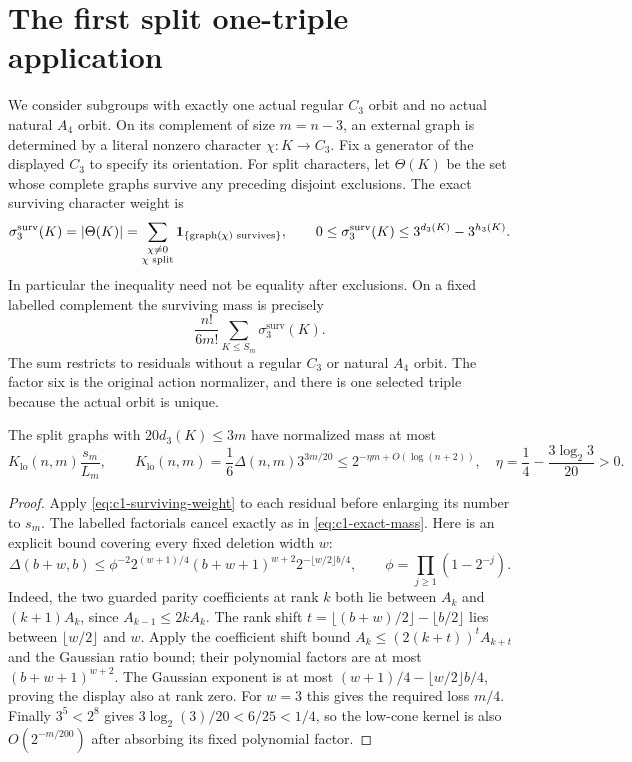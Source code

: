 \section{The first split one-triple application}\label{sec:first-c1}
We consider subgroups with exactly one actual regular $C_3$ orbit and
no actual natural $A_4$ orbit. On its complement of size $m=n-3$, an
external graph is determined by a literal nonzero character
$\chi:K\to C_3$. Fix a generator of the displayed $C_3$ to specify
its orientation. For split characters, let $\Theta(K)$ be the set
whose complete graphs survive any preceding disjoint exclusions.
The exact surviving character weight is
\begin{equation}\label{eq:c1-surviving-weight}
 \sigma^{\mathrm{surv}}_3(K)=|\Theta(K)|
 =\sum_{\substack{\chi\ne0\\\chi\text{ split}}}
       {\bf1}_{\{\operatorname{graph}(\chi)\text{ survives}\}},
 \qquad
 0\leq\sigma^{\mathrm{surv}}_3(K)\leq3^{d_3(K)}-3^{h_3(K)}.
\end{equation}
In particular the inequality need not be equality after exclusions.
On a fixed labelled complement the surviving mass is precisely
\begin{equation}\label{eq:c1-exact-mass}
 \frac{n!}{6m!}\sum_{K\leq S_m}\sigma^{\mathrm{surv}}_3(K).
\end{equation}
The sum restricts to residuals without a regular $C_3$ or natural
$A_4$ orbit. The factor six is the original action normalizer, and
there is one selected triple because the actual orbit is unique.

\begin{proposition}\label{prop:c1-low}
The split graphs with $20d_3(K)\leq3m$ have normalized mass at most
\[
 K_{\mathrm{lo}}(n,m)\frac{s_m}{L_m},\qquad
 K_{\mathrm{lo}}(n,m)=\frac16\Delta(n,m)3^{3m/20}
 \leq2^{-\eta m+O(\log(n+2))},
 \quad \eta=\frac14-\frac{3\log_2 3}{20}>0.
\]
\end{proposition}
\begin{proof}
Apply \eqref{eq:c1-surviving-weight} to each residual before enlarging
its number to $s_m$. The labelled factorials cancel exactly as in
\eqref{eq:c1-exact-mass}. Here is an explicit bound covering every
fixed deletion width $w$:
\begin{equation}\label{eq:arbitrary-width-pointing}
 \Delta(b+w,b)\leq
 \phi^{-2}2^{(w+1)/4}(b+w+1)^{w+2}
 2^{-\lfloor w/2\rfloor b/4},
 \qquad \phi=\prod_{j\geq1}(1-2^{-j}).
\end{equation}
Indeed, the two guarded parity coefficients at rank $k$ both lie
between $A_k$ and $(k+1)A_k$, since $A_{k-1}\leq2kA_k$.
The rank shift $t=\lfloor(b+w)/2\rfloor-\lfloor b/2\rfloor$
lies between $\lfloor w/2\rfloor$ and $w$. Apply the coefficient
shift bound $A_k\leq(2(k+t))^tA_{k+t}$ and the Gaussian ratio bound;
their polynomial factors are at most $(b+w+1)^{w+2}$.
The Gaussian exponent is at most
$(w+1)/4-\lfloor w/2\rfloor b/4$, proving the display also at rank zero.
For $w=3$ this gives the required loss $m/4$. Finally $3^5<2^8$
gives $3\log_2(3)/20<6/25<1/4$, so the low-cone kernel is also
$O(2^{-m/200})$ after absorbing its fixed polynomial factor.
\end{proof}

